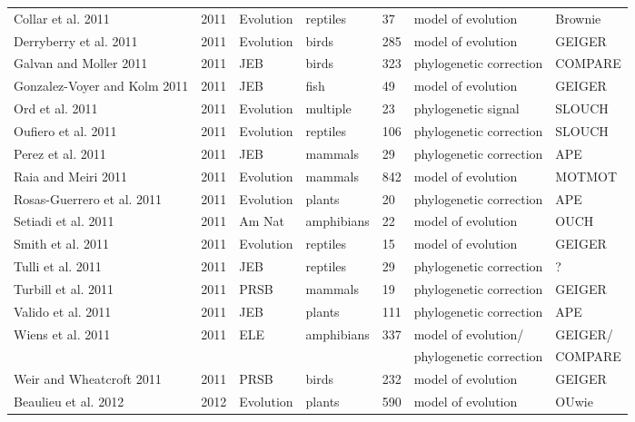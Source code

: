 \documentclass[a4paper,12pt]{article}
\begin{document}
\begin{landscape}
\begin{center}
\begin{longtable}{p{6cm}llllll}
Collar et al. 2011    &   2011    &   Evolution   &   reptiles    &   37  &   model of evolution  &   Brownie \\
Derryberry et al. 2011    &   2011    &   Evolution   &   birds   &   285 &   model of evolution  &   GEIGER  \\
Galvan and Moller 2011    &   2011    &   JEB &   birds   &   323 &   phylogenetic correction &   COMPARE \\
Gonzalez-Voyer and Kolm 2011  &   2011    &   JEB &   fish    &   49  &   model of evolution  &   GEIGER  \\
Ord et al. 2011   &   2011    &   Evolution   &   multiple    &   23  &   phylogenetic signal &   SLOUCH  \\
Oufiero et al. 2011   &   2011    &   Evolution   &   reptiles    &   106 &   phylogenetic correction &   SLOUCH  \\
Perez et al. 2011 &   2011    &   JEB &   mammals &   29  &   phylogenetic correction &   APE \\
Raia and Meiri 2011   &   2011    &   Evolution   &   mammals &   842 &   model of evolution  &   MOTMOT  \\
Rosas-Guerrero et al. 2011    &   2011    &   Evolution   &   plants  &   20  &   phylogenetic correction &   APE \\
Setiadi et al. 2011   &   2011    &   Am Nat  &   amphibians  &   22  &   model of evolution  &   OUCH    \\
Smith et al. 2011 &   2011    &   Evolution   &   reptiles    &   15  &   model of evolution  &   GEIGER  \\
Tulli et al. 2011 &   2011    &   JEB &   reptiles    &   29  &   phylogenetic correction &   ?   \\
Turbill et al. 2011   &   2011    &   PRSB    &   mammals &   19  &   phylogenetic correction &   GEIGER  \\
Valido et al. 2011    &   2011    &   JEB &   plants  &   111 &   phylogenetic correction &   APE \\
Wiens et al. 2011 &   2011    &   ELE &   amphibians  &   337 &   model of evolution/ &   GEIGER/ \\
    &       &       &       &       &   phylogenetic correction &   COMPARE \\
Weir and Wheatcroft 2011  &   2011    &   PRSB    &   birds   &   232 &   model of evolution  &   GEIGER  \\
Beaulieu et al. 2012  &   2012    &   Evolution   &   plants  &   590 &   model of evolution  &   OUwie   \\

\end{longtable}
\end{center}
\end{landscape}
\end{document}
